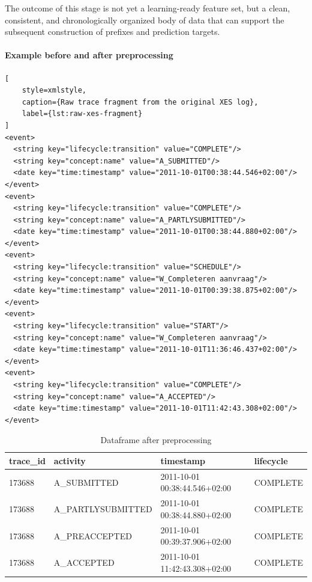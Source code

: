 \indent The outcome of this stage is not yet a learning-ready feature set,
but a clean, consistent, and chronologically organized body of data that can
support the subsequent construction of prefixes and prediction targets.

\paragraph{Example before and after preprocessing}\mbox{}\par\vspace{\baselineskip}

\begin{lstlisting}[
    style=xmlstyle,
    caption={Raw trace fragment from the original XES log},
    label={lst:raw-xes-fragment}
]
<event>
  <string key="lifecycle:transition" value="COMPLETE"/>
  <string key="concept:name" value="A_SUBMITTED"/>
  <date key="time:timestamp" value="2011-10-01T00:38:44.546+02:00"/>
</event>
<event>
  <string key="lifecycle:transition" value="COMPLETE"/>
  <string key="concept:name" value="A_PARTLYSUBMITTED"/>
  <date key="time:timestamp" value="2011-10-01T00:38:44.880+02:00"/>
</event>
<event>
  <string key="lifecycle:transition" value="SCHEDULE"/>
  <string key="concept:name" value="W_Completeren aanvraag"/>
  <date key="time:timestamp" value="2011-10-01T00:39:38.875+02:00"/>
</event>
<event>
  <string key="lifecycle:transition" value="START"/>
  <string key="concept:name" value="W_Completeren aanvraag"/>
  <date key="time:timestamp" value="2011-10-01T11:36:46.437+02:00"/>
</event>
<event>
  <string key="lifecycle:transition" value="COMPLETE"/>
  <string key="concept:name" value="A_ACCEPTED"/>
  <date key="time:timestamp" value="2011-10-01T11:42:43.308+02:00"/>
</event>
\end{lstlisting}

\begin{table}[H]
\centering
\caption{Dataframe after preprocessing}
\label{tab:preprocessed-dataframe}
\small
\begin{tabular}{llll}
\toprule
\textbf{trace\_id} & \textbf{activity} & \textbf{timestamp} & \textbf{lifecycle} \\
\midrule
173688 & A\_SUBMITTED & 2011-10-01 00:38:44.546+02:00 & COMPLETE \\
173688 & A\_PARTLYSUBMITTED & 2011-10-01 00:38:44.880+02:00 & COMPLETE \\
173688 & A\_PREACCEPTED & 2011-10-01 00:39:37.906+02:00 & COMPLETE \\
173688 & A\_ACCEPTED & 2011-10-01 11:42:43.308+02:00 & COMPLETE \\
\bottomrule
\end{tabular}
\end{table}

